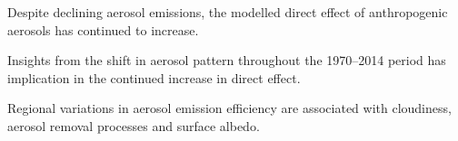 \documentclass[draft]{agujournal2019}
\begin{document}


\begin{keypoints}
\item Despite declining aerosol emissions, the modelled direct effect of anthropogenic aerosols has continued to increase. 
\item Insights from the shift in aerosol pattern throughout the 1970--2014 period has implication in the continued increase in direct effect.
\item Regional variations in aerosol emission efficiency are associated with cloudiness, aerosol removal processes and surface albedo.
\end{keypoints}

%
%

%
%

\end{document}
